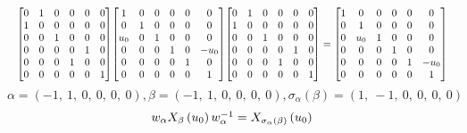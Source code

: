 \documentclass[11pt]{article}
\theoremstyle{definition}
\begin{document}
\[
\scaletoalign{\textwidth}{{\left[\begin{matrix}0 & 1 & 0 & 0 & 0 & 0\\1 & 0 & 0 & 0 & 0 & 0\\0 & 0 & 1 & 0 & 0 & 0\\0 & 0 & 0 & 0 & 1 & 0\\0 & 0 & 0 & 1 & 0 & 0\\0 & 0 & 0 & 0 & 0 & 1\end{matrix}\right]} {\left[\begin{matrix}1 & 0 & 0 & 0 & 0 & 0\\0 & 1 & 0 & 0 & 0 & 0\\u_{0} & 0 & 1 & 0 & 0 & 0\\0 & 0 & 0 & 1 & 0 & - u_{0}\\0 & 0 & 0 & 0 & 1 & 0\\0 & 0 & 0 & 0 & 0 & 1\end{matrix}\right]} {\left[\begin{matrix}0 & 1 & 0 & 0 & 0 & 0\\1 & 0 & 0 & 0 & 0 & 0\\0 & 0 & 1 & 0 & 0 & 0\\0 & 0 & 0 & 0 & 1 & 0\\0 & 0 & 0 & 1 & 0 & 0\\0 & 0 & 0 & 0 & 0 & 1\end{matrix}\right]} = {\left[\begin{matrix}1 & 0 & 0 & 0 & 0 & 0\\0 & 1 & 0 & 0 & 0 & 0\\0 & u_{0} & 1 & 0 & 0 & 0\\0 & 0 & 0 & 1 & 0 & 0\\0 & 0 & 0 & 0 & 1 & - u_{0}\\0 & 0 & 0 & 0 & 0 & 1\end{matrix}\right]}}
\]
\[
\alpha = \left( -1, \  1, \  0, \  0, \  0, \  0\right), \beta = \left( -1, \  1, \  0, \  0, \  0, \  0\right), \sigma_{\alpha}(\beta) = \left( 1, \  -1, \  0, \  0, \  0, \  0\right)
\]
\[
\scaletoalign{\textwidth}{w_{\alpha} X_{\beta}\left(u_{0}\right) w_{\alpha}^{-1} = X_{\sigma_{\alpha}\left(\beta\right)}\left(u_{0}\right)}
\]
\end{document}

